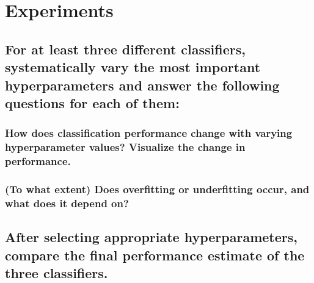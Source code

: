 
\section{Experiments}
\label{sec:Experiments}






\subsection{For at least three different classifiers, systematically vary the most important hyperparameters and answer the following questions for each of them: }
\label{sec:Experiments:a}



\subsubsection{How does classification performance change with varying hyperparameter values? Visualize the change in performance. }
\label{sec:Experiments:a-1}



\subsubsection{(To what extent) Does overfitting or underfitting occur, and what does it depend on? }
\label{sec:Experiments:a-2}






\subsection{After selecting appropriate hyperparameters, compare the final performance estimate of the three classifiers. }
\label{sec:Experiments:b}



